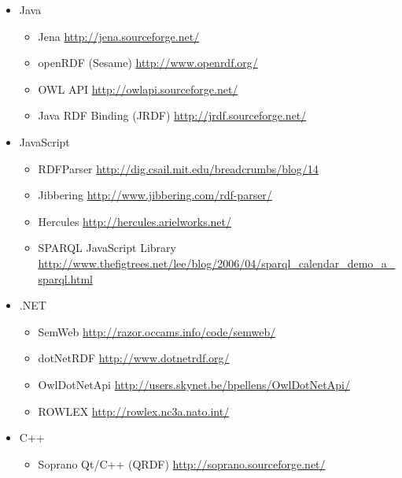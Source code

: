\documentclass[xcolor=dvipsnames]{beamer}
\begin{document}
\begin{frame}[plain]
\begin{itemize}
	\item Java                              
		\begin{itemize}                       
			\item 	Jena 										    \hfill {\scriptsize\url{http://jena.sourceforge.net/}}
			\item openRDF (Sesame) 					    \hfill {\scriptsize\url{http://www.openrdf.org/}}
			\item OWL API										    \hfill {\scriptsize\url{http://owlapi.sourceforge.net/}}
			\item Java RDF Binding (JRDF)		    \hfill {\scriptsize\url{http://jrdf.sourceforge.net/}}
		\end{itemize}                         
	\item JavaScript                        
		\begin{itemize}                       
			\item RDFParser                     \hfill {\scriptsize\url{http://dig.csail.mit.edu/breadcrumbs/blog/14}}
			\item Jibbering                     \hfill {\scriptsize\url{http://www.jibbering.com/rdf-parser/}}
			\item Hercules                      \hfill {\scriptsize\url{http://hercules.arielworks.net/}}
			\item SPARQL JavaScript Library     \hfill {\scriptsize\url{http://www.thefigtrees.net/lee/blog/2006/04/sparql_calendar_demo_a_sparql.html}}
		\end{itemize}                         
	\item .NET                              
		\begin{itemize}                       
			\item SemWeb                        \hfill {\scriptsize\url{http://razor.occams.info/code/semweb/}}
			\item dotNetRDF                     \hfill {\scriptsize\url{http://www.dotnetrdf.org/}}
			\item OwlDotNetApi                  \hfill {\scriptsize\url{http://users.skynet.be/bpellens/OwlDotNetApi/}}
			\item ROWLEX                        \hfill {\scriptsize\url{http://rowlex.nc3a.nato.int/}}
		\end{itemize}                         
	\item C++                               
		\begin{itemize}                       
			\item Soprano  Qt/C++ (QRDF)        \hfill {\scriptsize\url{http://soprano.sourceforge.net/}}
		\end{itemize}
\end{itemize}
\end{frame}
\end{document}
